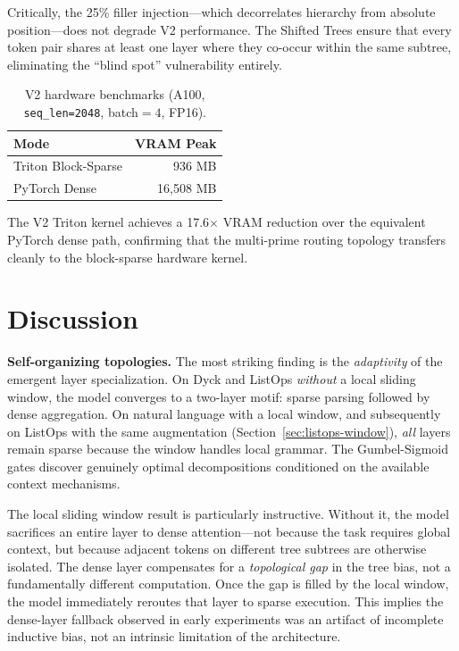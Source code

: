 \documentclass[11pt,a4paper]{article}
\begin{document}
Critically, the 25\% filler injection---which decorrelates hierarchy from absolute position---does not degrade V2 performance. The Shifted Trees ensure that every token pair shares at least one layer where they co-occur within the same subtree, eliminating the ``blind spot'' vulnerability entirely.

\begin{table}[h]
\centering
\caption{V2 hardware benchmarks (A100, \texttt{seq\_len=2048}, batch$=4$, FP16).}
\label{tab:v2-hardware}
\begin{tabular}{@{}lr@{}}
\toprule
Mode & VRAM Peak \\
\midrule
Triton Block-Sparse & 936 MB \\
PyTorch Dense & 16{,}508 MB \\
\bottomrule
\end{tabular}
\end{table}

The V2 Triton kernel achieves a 17.6$\times$ VRAM reduction over the equivalent PyTorch dense path, confirming that the multi-prime routing topology transfers cleanly to the block-sparse hardware kernel.

\section{Discussion}

\textbf{Self-organizing topologies.} The most striking finding is the \emph{adaptivity} of the emergent layer specialization. On Dyck and ListOps \emph{without} a local sliding window, the model converges to a two-layer motif: sparse parsing followed by dense aggregation. On natural language with a local window, and subsequently on ListOps with the same augmentation (Section~\ref{sec:listops-window}), \emph{all} layers remain sparse because the window handles local grammar. The Gumbel-Sigmoid gates discover genuinely optimal decompositions conditioned on the available context mechanisms.

The local sliding window result is particularly instructive. Without it, the model sacrifices an entire layer to dense attention---not because the task requires global context, but because adjacent tokens on different tree subtrees are otherwise isolated. The dense layer compensates for a \emph{topological gap} in the tree bias, not a fundamentally different computation. Once the gap is filled by the local window, the model immediately reroutes that layer to sparse execution. This implies the dense-layer fallback observed in early experiments was an artifact of incomplete inductive bias, not an intrinsic limitation of the architecture.
\end{document}
